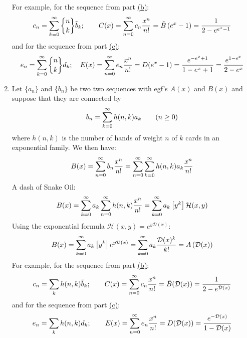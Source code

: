 \begin{solution}
\begin{enumerate}[label=(\alph*)]
\[        \]
        For example, for the sequence from part \hyperlink{eq:ch4:12:b}{(b)}:
        \[
            c_n = \bsum[k] \stirlingSnd{n}{k}\tilde{b}_k; \qquad   C(x) = \bsum c_n\expcoeff = \tilde{B}\left(e^x-1\right) = \frac{1}{2-e^{e^x - 1}}
        \]
        and for the sequence from part \hyperlink{eq:ch4:12:c}{(c)}:
        \[
            e_n = \bsum[k] \stirlingSnd{n}{k} d_k; \quad  E(x) = \bsum e_n\expcoeff = D(e^x-1) = \frac{e^{-e^x + 1}}{1-e^x+1} = \frac{e^{1-e^x}}{2-e^x}
        \]
        \item Let $\{a_n\}$ and $\{b_n\}$ be two two sequences with egf's $A(x)$ and $B(x)$ and suppose that they are connected by
        \[
            b_n = \bsum[k] h(n,k)a_k \qquad (n\geq0)
        \]
        where $h(n,k)$ is the number of hands of weight $n$ of $k$ cards in an exponential family. We then have:
        \[
            B(x) = \bsum[n] b_n \frac{x^n}{n!} = \bsum[n]\bsum[k] h(n,k) a_k \frac{x^n}{n!}
        \]
        A dash of Snake Oil:
        \[
            B(x) = \bsum[k] a_k \bsum[n] h(n,k)\frac{x^n}{n!} = \bsum[k] a_k \coeff{y^k}\mathcal{H}(x, y)
        \]
        Using the exponential formula $\mathcal{H}(x,y) = e^{y\mathcal{D}(x)}$:
        \[
            B(x) = \bsum[k] a_k \coeff{y^k} e^{y\mathcal{D}(x)} = \bsum[k] a_k \frac{\mathcal{D}(x)^k}{k!} = A\left(\mathcal{D}(x)\right)
        \]
        For example, for the sequence from part \hyperlink{eq:ch4:12:b}{(b)}:
        \[
            c_n = \sum_k h(n,k)\tilde{b}_k; \qquad    C(x) = \bsum c_n \expcoeff = \tilde{B}(\mathcal{D}(x)) = \frac{1}{2-e^{\mathcal{D}(x)}}
        \]
        and for the sequence from part \hyperlink{eq:ch4:12:c}{(c)}:
        \[
            e_n = \sum_k h(n,k)d_k; \qquad  E(x) = \bsum e_n \expcoeff = D(\mathcal{D}(x)) = \frac{e^{-\mathcal{D}(x)}}{1-\mathcal{D}(x)}
        \]
    \end{enumerate} 
\end{solution}

